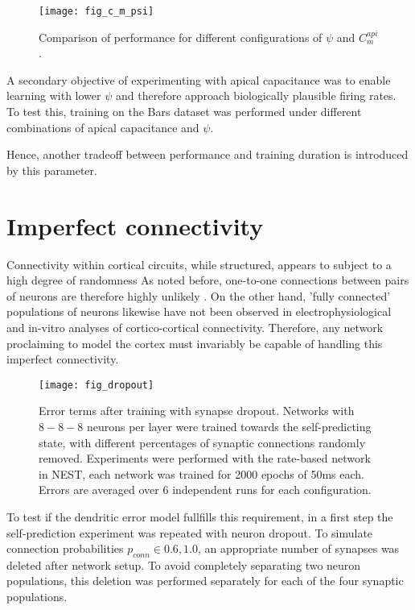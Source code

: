 \begin{figure}[h]
    \centering
    \texttt{[image: fig\_c\_m\_psi]}
    \caption[Comparison of performance for different configurations of $\psi$ and $C_m^{api}$]{Comparison of performance
    for different  configurations of $\psi$ and $C_m^{api}$.}
    \label{fig-c-m-psi}
\end{figure}

A secondary objective of experimenting with apical capacitance was to enable learning with lower $\psi$ and therefore
approach biologically plausible firing rates. To test this, training on the Bars dataset was performed under different
combinations of apical capacitance and $\psi$. 



Hence, another tradeoff between performance and training duration is introduced by this parameter.


\section{Imperfect connectivity}

Connectivity within cortical circuits, while structured, appears to subject to a high degree of randomness
\citep{potjans2014cell} As noted before, one-to-one connections between pairs of neurons are therefore highly unlikely
\citep{whittington2019theories}. On the other hand, 'fully connected' populations of neurons likewise have not been
observed in electrophysiological \citep{thomson2002synaptic} and in-vitro \citep{binzegger2004quantitative} analyses of
cortico-cortical connectivity. Therefore, any network proclaiming to model the cortex must invariably be capable of
handling this imperfect connectivity.

\begin{figure}[h]
    \centering
    \texttt{[image: fig\_dropout]}
    \caption[Error terms after training with synapse dropout]{Error terms after training with synapse dropout. Networks
        with $8-8-8$ neurons per layer were trained towards the self-predicting state, with different percentages of
        synaptic connections randomly removed. Experiments were performed with the rate-based network in NEST, each
        network was trained for 2000 epochs of 50ms each. Errors are averaged over 6 independent runs for each
        configuration.}
    \label{fig-dropout}
\end{figure}

To test if the dendritic error model fullfills this requirement, in a first step the self-prediction experiment was
repeated with neuron dropout. To simulate connection probabilities $p_{conn} \in {0.6, 1.0}$, an appropriate number of
synapses was deleted after network setup. To avoid completely separating two neuron populations, this deletion was
performed separately for each of the four synaptic populations.


